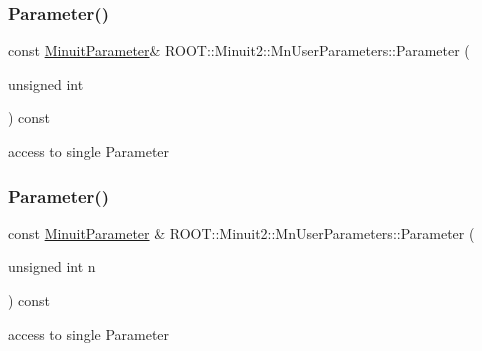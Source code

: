 \subsubsection{\texorpdfstring{Parameter()}{Parameter()}\hspace{0.1cm}{\footnotesize\ttfamily [2/3]}}
{\footnotesize\ttfamily const \mbox{\hyperlink{classROOT_1_1Minuit2_1_1MinuitParameter}{Minuit\+Parameter}}\& R\+O\+O\+T\+::\+Minuit2\+::\+Mn\+User\+Parameters\+::\+Parameter (\begin{DoxyParamCaption}\item[{unsigned int}]{ }\end{DoxyParamCaption}) const}



access to single Parameter 

\mbox{\label{classROOT_1_1Minuit2_1_1MnUserParameters_a12ee4c4660c21a660fb5f9d1f30b2fc2}} 
\subsubsection{\texorpdfstring{Parameter()}{Parameter()}\hspace{0.1cm}{\footnotesize\ttfamily [3/3]}}
{\footnotesize\ttfamily const \mbox{\hyperlink{classROOT_1_1Minuit2_1_1MinuitParameter}{Minuit\+Parameter}} \& R\+O\+O\+T\+::\+Minuit2\+::\+Mn\+User\+Parameters\+::\+Parameter (\begin{DoxyParamCaption}\item[{unsigned int}]{n }\end{DoxyParamCaption}) const}



access to single Parameter 

